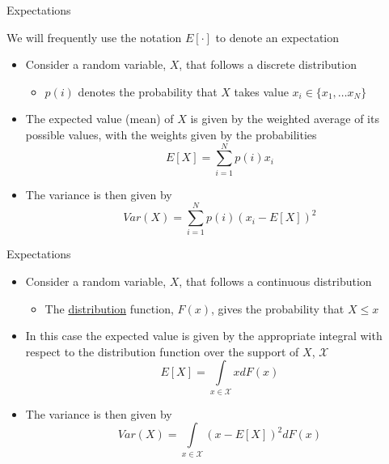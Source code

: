 \begin{frame}{Expectations}

We will frequently use the notation $E[\cdot]$ to denote an expectation
\vspace{2mm}
\begin{itemize}
\item	Consider a random variable, $X$, that follows a discrete distribution
\begin{itemize}
	\item	$p(i)$ denotes the probability that $X$ takes value $x_{i} \in \{ x_{1}, \ldots x_{N} \}$
\end{itemize}
\vspace{2mm}
\item	The expected value (mean) of $X$ is given by the weighted average of its possible values, with the weights given by the probabilities
\[
E[X] = \sum_{i=1}^{N} p(i) x_{i}
\]
\item	The variance is then given by
\[
Var(X) = \sum_{i=1}^{N} p(i) (x_{i}-E[X])^{2}
\]
\end{itemize}

\end{frame}



\begin{frame}{Expectations}

\begin{itemize}
\item	Consider a random variable, $X$, that follows a continuous distribution
\begin{itemize}
	\item	The \href{https://en.wikipedia.org/wiki/Cumulative_distribution_function}{distribution} function, $F(x)$, gives the probability that $X\leq x$
\vspace{2mm}
\end{itemize}
\item	In this case the expected value is given by the appropriate integral  with respect to the distribution function over the support of $X$, $\mathcal{X}$
\[
E[X] = \int\limits_{x\in\mathcal{X}} x dF(x)
\]
\item	The variance is then given by
\[
Var(X) = \int\limits_{x\in\mathcal{X}} (x-E[X])^{2} dF(x)
\]
\end{itemize}

\end{frame}

